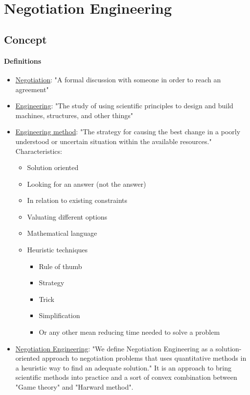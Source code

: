 \section{Negotiation Engineering}

\subsection{Concept}

\paragraph{Definitions}

\begin{itemize}
    \item \underline{Negotiation}: "A formal discussion with someone in order
        to reach an agreement"
    \item \underline{Engineering}: "The study of using scientific principles to design and build
        machines, structures, and other things"
    \item \underline{Engineering method}: "The strategy for causing the best
        change in a poorly understood or uncertain situation within the
        available resources." Characteristics:
        \begin{itemize}
            \item Solution oriented
            \item Looking for an answer (not the answer)
            \item In relation to existing constraints
            \item Valuating different options
            \item Mathematical language
            \item Heuristic techniques
                \begin{itemize}
                    \item Rule of thumb
                    \item Strategy
                    \item Trick
                    \item Simplification
                    \item Or any other mean reducing time needed to solve
                        a problem
                \end{itemize}
        \end{itemize}
    \item \underline{Negotiation Engineering}: "We define Negotiation Engineering
        as a solution-oriented approach to negotiation problems that uses
        quantitative methods in a heuristic way to find an adequate solution."
        It is an approach to bring scientific methods into practice and a sort
        of convex combination between "Game theory" and "Harward method".
\end{itemize}

